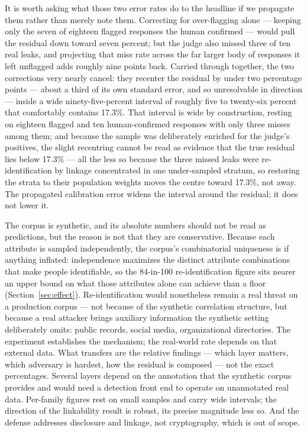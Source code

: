 \documentclass[11pt,a4paper]{article}
\begin{document}
It is worth asking what those two error rates do to the headline if we propagate them rather than
merely note them. Correcting for over-flagging alone --- keeping only the seven of eighteen flagged
responses the human confirmed --- would pull the residual down toward seven percent; but the judge also
missed three of ten real leaks, and projecting that miss rate across the far larger body of responses it
left unflagged adds roughly nine points back. Carried through together, the two corrections very nearly
cancel: they recenter the residual by under two percentage points --- about a third of its own standard
error, and so unresolvable in direction --- inside a wide ninety-five-percent interval of roughly five to
twenty-six percent that comfortably contains 17.3\%. That interval is wide by construction, resting on
eighteen flagged and ten human-confirmed responses with only three misses among them; and because the
sample was deliberately enriched for the judge's positives, the slight recentring cannot be read as
evidence that the true residual lies below 17.3\% --- all the less so because the three missed leaks were
re-identification by linkage concentrated in one under-sampled stratum, so restoring the strata
to their population weights moves the centre toward 17.3\%, not away. The propagated calibration error
widens the interval around the residual; it does not lower it.

The corpus is synthetic, and its absolute numbers should not be read as predictions, but the reason is
not that they are conservative. Because each attribute is sampled independently, the corpus's
combinatorial uniqueness is if anything inflated: independence maximizes the distinct attribute
combinations that make people identifiable, so the 84-in-100 re-identification figure sits nearer an
upper bound on what those attributes alone can achieve than a floor (Section~\ref{sec:effect}).
Re-identification would nonetheless remain a real threat on a production corpus --- not because of the
synthetic correlation structure, but because a real attacker brings auxiliary information the synthetic
setting deliberately omits: public records, social media, organizational directories. The experiment
establishes the mechanism; the real-world rate depends on that external data. What transfers are the
relative findings --- which layer matters, which adversary is hardest, how the residual is composed ---
not the exact percentages. Several layers
depend on the annotation that the synthetic corpus provides and would need a detection front end to
operate on unannotated real data. Per-family figures rest on small samples and carry wide intervals; the
direction of the linkability result is robust, its precise magnitude less so. And the defense addresses
disclosure and linkage, not cryptography, which is out of scope.
\end{document}
